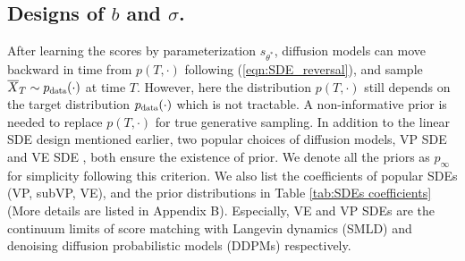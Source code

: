\documentclass[letterpaper,10pt,reqno]{amsart}
\def\eqref#1{(\ref{#1})}
\numberwithin{equation}{section}
\begin{document}
\subsection{Designs of $b$ and $\sigma$.} After learning the scores by parameterization $s_{\theta^*}$, diffusion models can move backward in time from $p(T,\cdot)$ following \eqref{eqn:SDE_reversal}, and sample $\overline{X}_T  \sim p_{\scalebox{0.7}{data}}(\cdot)$ at time $T$. However, here the distribution $p(T, \cdot)$ still depends on the target distribution $p_{\scalebox{0.7}{data}}(\cdot)$ which is not tractable. A non-informative prior is needed to replace $p(T,\cdot)$ for true generative sampling. In addition to the linear SDE design mentioned earlier, two popular choices of diffusion models, VP SDE \cite{Ho20} and VE SDE \cite{Song20}, both ensure the existence of prior. We denote all the priors as $p_{\infty}$ for simplicity following this criterion. We also list the coefficients of popular SDEs (VP, subVP, VE), and the prior distributions in Table \ref{tab:SDEs coefficients} (More details are listed in Appendix B). Especially, VE and VP SDEs are the continuum limits of 
score matching with Langevin dynamics (SMLD) \cite{Song19}
and denoising diffusion probabilistic models (DDPMs) \cite{Ho20} respectively.

\begin{table}[!htbp]
\centering
{}
\caption{Design space of $b$ and $\sigma$ for different SDEs.}
\label{tab:SDEs coefficients} 
\end{table}
\end{document}
